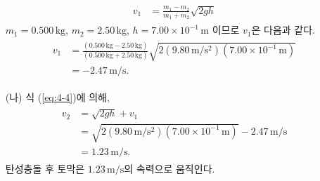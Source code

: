 \documentclass[floatfix,nofootinbib,superscriptaddress,fleqn]{revtex4-2}
\begin{document}
\begin{itemize}
\begin{align}
\begin{split}
    v_1 &= \frac{m_1-m_2}{m_1+m_2}\sqrt{2gh}  
  \end{split}
\end{align}
$m_1= 0.500\,\mathrm{kg}$, $m_2 = 2.50\,\mathrm{kg}$, 
$h=7.00\times 10^{-1}\,\mathrm{m}$ 이므로 $v_1$은 다음과 같다.
\begin{align}
  \begin{split}
    v_1 &= \frac{(0.500\,\mathrm{kg}-2.50\,\mathrm{kg})}
    {(0.500\,\mathrm{kg}+2.50\,\mathrm{kg})}
    \sqrt{2(9.80\,\mathrm{m/s^2})(7.00\times 10^{-1}\,\mathrm{m})}  \\
    &= -2.47\,\mathrm{m/s}.
  \end{split}
\end{align}
\item[(나)] 식 (\ref{eq:4-4})에 의해,
\begin{align}
  \begin{split}
    v_2 &= \sqrt{2gh}+v_1  \\
    &=\sqrt{2(9.80\,\mathrm{m/s^2})(7.00\times 10^{-1}\,\mathrm{m})}
    -2.47\,\mathrm{m/s} \\
    &=1.23\,\mathrm{m/s}.
  \end{split}
\end{align}
탄성충돌 후 토막은 $1.23\,\mathrm{m/s}$의 속력으로 움직인다.
\end{itemize}
\end{document}
